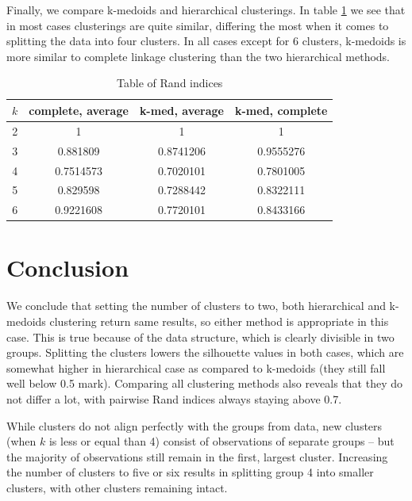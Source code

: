 \documentclass[12pt]{article}
\begin{document}
Finally, we compare k-medoids and hierarchical clusterings. In table \ref{tab:rand} we see that in most cases clusterings are quite similar, differing the most
when it comes to splitting the data into four clusters. In all cases except for 6 clusters, k-medoids is more similar
to complete linkage clustering than the two hierarchical methods.
  \begin{table}[h]
    \centering
  \begin{tabular}{ |c||c|c|c| } 
   \hline
   $k$ & complete, average  & k-med, average & k-med, complete \\
   \hline 
   2 & 1 & 1 & 1 \\ 
   3 & 0.881809 & 0.8741206 &0.9555276 \\ 
   4 & 0.7514573 &0.7020101 & 0.7801005 \\
   5 & 0.829598 &0.7288442 & 0.8322111 \\
   6 & 0.9221608 & 0.7720101& 0.8433166 \\
   \hline
  \end{tabular}
  \caption{Table of Rand indices}
  \label{tab:rand}
\end{table}

\section{Conclusion}

We conclude that setting the number of clusters to two, both hierarchical and k-medoids clustering return same results, so either method is appropriate in this case.
This is true because of the data structure, which is clearly divisible in two groups. Splitting the clusters lowers the silhouette values in both cases, which 
are somewhat higher in hierarchical case as compared to k-medoids (they still fall well below 0.5 mark). Comparing all clustering methods also reveals that they do not
differ a lot, with pairwise Rand indices always staying above 0.7.

While clusters do not align perfectly with the groups from data, new clusters (when $k$ is less or equal than 4) consist of observations of separate groups -- but the majority of observations still remain in 
the first, largest cluster. Increasing the number of clusters to five or six results in splitting group 4 into smaller clusters, with other clusters remaining intact.
\end{document}
